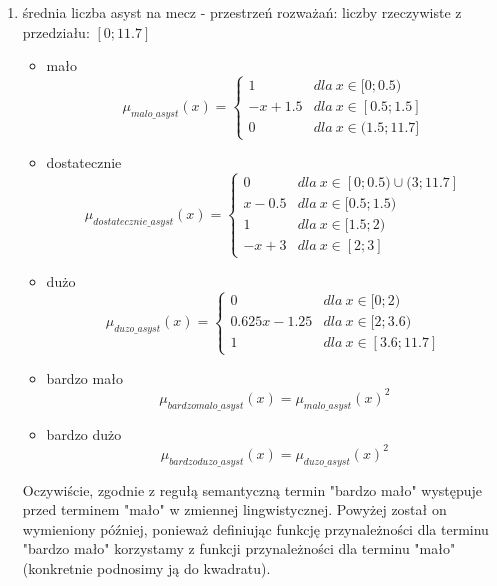 \documentclass{classrep}
\begin{document}
\begin{enumerate}
    \item średnia liczba asyst na mecz - przestrzeń rozważań: liczby rzeczywiste z przedziału: $[0;11.7]$
    \begin{itemize}
        \item mało
        \begin{equation}
            \mu_{malo\_asyst}(x) = \left\{\begin{matrix} 1 & dla \: x\in[0;0.5) \\ -x + 1.5 & dla \: x\in [0.5; 1.5] \\ 0 & dla \: x\in (1.5; 11.7] \end{matrix}\right.
        \end{equation}
         \item dostatecznie
        \begin{equation}
            \mu_{dostatecznie\_asyst}(x) = \left\{\begin{matrix}0 & dla \: x\in [0; 0.5) \cup (3; 11.7]\\ x - 0.5 & dla \: x\in[0.5;1.5) \\ 1 & dla \: x\in [1.5; 2) \\ -x + 3 & dla \: x\in [2;3] \end{matrix}\right.
        \end{equation}
        \item dużo
        \begin{equation}
            \mu_{duzo\_asyst}(x) = \left\{\begin{matrix}0 & dla \: x\in [0; 2) \\ 0.625x - 1.25 & dla \: x\in[2;3.6) \\ 1 & dla \: x\in [3.6; 11.7] \end{matrix}\right.
        \end{equation}
        \item bardzo mało
        \begin{equation}
            \mu_{bardzomalo\_asyst}(x) = \mu_{malo\_asyst}(x)^2
        \end{equation}
        \item bardzo dużo
        \begin{equation}
            \mu_{bardzoduzo\_asyst}(x) = \mu_{duzo\_asyst}(x)^2
        \end{equation}
    \end{itemize}
    Oczywiście, zgodnie z regułą semantyczną termin "bardzo mało" występuje przed terminem "mało" w zmiennej lingwistycznej. Powyżej został on wymieniony później, ponieważ definiując funkcję przynależności dla terminu "bardzo mało" korzystamy z funkcji przynależności dla terminu "mało" (konkretnie podnosimy ją do kwadratu).

\end{enumerate}
\end{document}
